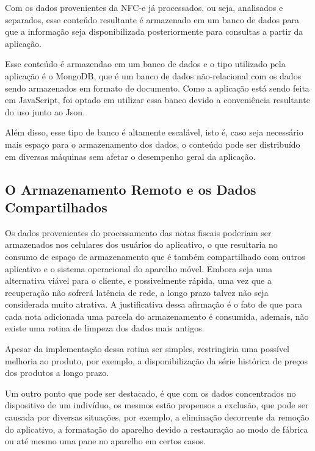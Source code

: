 Com os dados provenientes da NFC-e já processados, ou seja, analisados e separados, esse conteúdo resultante é armazenado em um banco de dados para que a informação seja disponibilizada posteriormente para consultas a partir da aplicação.

Esse conteúdo é armazendao em um banco de dados e o tipo utilizado pela aplicação é o MongoDB, que é um banco de dados não-relacional com os dados sendo armazenados em formato de documento. Como a aplicação está sendo feita em JavaScript, foi optado em utilizar essa banco devido a conveniência resultante do uso junto ao Json.

Além disso, esse tipo de banco é altamente escalável, isto é, caso seja necessário mais espaço para o armazenamento dos dados, o conteúdo pode ser distribuído em diversas máquinas sem afetar o desempenho geral da aplicação.

\subsection{O Armazenamento Remoto e os Dados Compartilhados}

Os dados provenientes do processamento das notas fiscais poderiam ser armazenados nos celulares dos usuários do aplicativo, o que resultaria no consumo de espaço de armazenamento que é também compartilhado com outros aplicativo e o sistema operacional do aparelho móvel. Embora seja uma alternativa viável para o cliente, e possivelmente rápida, uma vez que a recuperação não sofrerá latência de rede, a longo prazo talvez não seja considerada muito atrativa. A justificativa dessa afirmação é o fato de que para cada nota adicionada uma parcela do armazenamento é consumida, ademais, não existe uma rotina de limpeza dos dados mais antigos.

Apesar da implementação dessa rotina ser simples, restringiria uma possível melhoria ao produto, por exemplo, a disponibilização da série histórica de preços dos produtos a longo prazo.

Um outro ponto que pode ser destacado, é que com os dados concentrados no dispositivo de um indivíduo, os mesmos estão propensos a exclusão, que pode ser causada por diversas situações, por exemplo, a eliminação decorrente da remoção do aplicativo, a formatação do aparelho devido a restauração ao modo de fábrica ou até mesmo uma pane no aparelho em certos casos.


